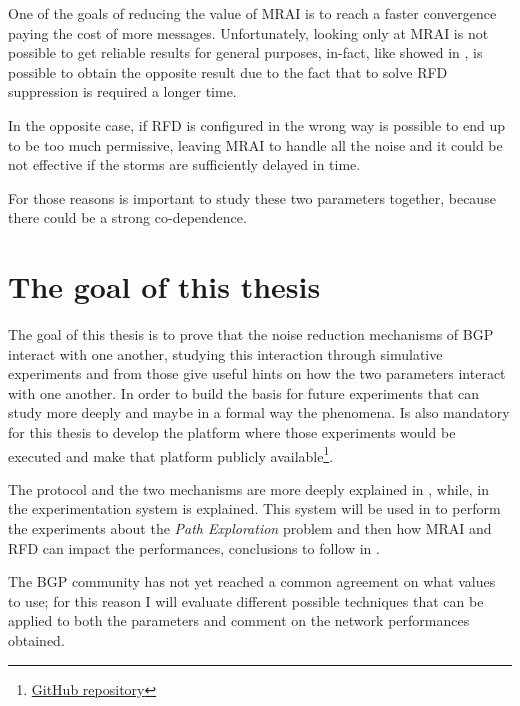 One of the goals of reducing the value of \ac{MRAI} is to reach a faster convergence
paying the cost of more messages.
Unfortunately, looking only at \ac{MRAI} is not possible to get reliable results
for general purposes, in-fact, like showed in , is possible
to obtain the opposite result due to the fact that to solve \ac{RFD} suppression
is required a longer time.

In the opposite case, if \ac{RFD} is configured in the wrong way is possible to
end up to be too much permissive, leaving \ac{MRAI} to handle all the noise and
it could be not effective if the storms are sufficiently delayed in time.

For those reasons is important to study these two parameters together, because
there could be a strong co-dependence.

\section{The goal of this thesis}
\label{sec:thesis_goal}


The goal of this thesis is to prove that the noise reduction mechanisms of \ac{BGP}
interact with one another, studying this interaction through simulative experiments
and from those give useful hints on how the two parameters interact with one another.
In order to build the basis for future experiments that can study more deeply
and maybe in a formal way the phenomena.
Is also mandatory for this thesis to develop the platform where those experiments
would be executed and make that platform publicly
available\footnote{\href{https://github.com/tiamilani/BGPFSM}{GitHub repository}}.

The protocol and the two mechanisms are more deeply explained in ,
while, in  the experimentation system is explained.
This system will be used in
to perform the experiments about the \textit{Path Exploration} problem and then
how \ac{MRAI} and \ac{RFD} can impact the performances, conclusions to follow
in .

The \ac{BGP} community has not yet reached a common agreement on what values
to use; for this reason I will evaluate different possible techniques that can
be applied to both the parameters and comment on the network performances obtained.


